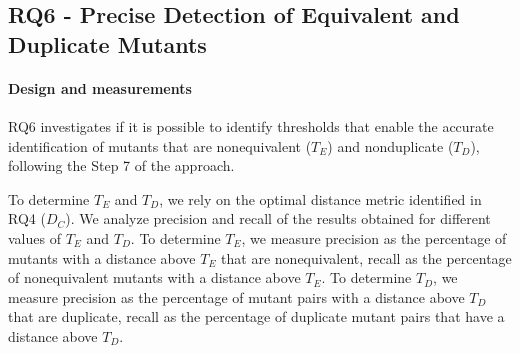 





\subsection{RQ6 - Precise Detection of Equivalent and Duplicate Mutants}
\label{sec:empirical:thrshold}
\paragraph{Design and measurements}

RQ6 investigates if it is possible to identify thresholds that enable the accurate identification of mutants that are nonequivalent ($T_E$) and nonduplicate ($T_D$), following the Step 7 of the approach.

To determine $T_E$ and $T_D$, 
we rely on the optimal distance metric identified in RQ4 ($D_C$).
We analyze  precision and recall of the results obtained for  different values of $T_E$ and $T_D$.
To determine $T_E$, we measure
precision as the percentage of mutants with a distance above $T_E$ that are nonequivalent, recall as the percentage of nonequivalent mutants with a distance above $T_E$.
To determine $T_D$, we measure
precision as the percentage of mutant pairs with a distance above $T_D$ that are duplicate, recall as the percentage of duplicate mutant pairs that have a distance above $T_D$.

